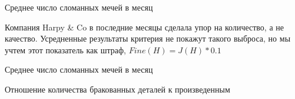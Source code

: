 \documentclass[8pt]{beamer}
\begin{document}
\begin{frame}{Среднее число сломанных мечей в месяц}
\begin{figure}[h]
\label{ris:6.png}
\end{figure}
Компания {Harpy \& Co} в последние месяцы сделала упор на количество, а не качество. Усредненные результаты критерия не покажут такого выброса, но мы учтем этот показатель как штраф, $Fine(H) = J(H) * 0.1$
\end{frame}

\begin{frame}{Среднее число сломанных мечей в месяц}
\begin{figure}[h]
\label{ris:7.png}
\end{figure}
\end{frame}

\begin{frame}{Отношение количества бракованных деталей к произведенным}
\begin{figure}[h]
\label{ris:8.png}
\end{figure}
\end{frame}
\end{document}
